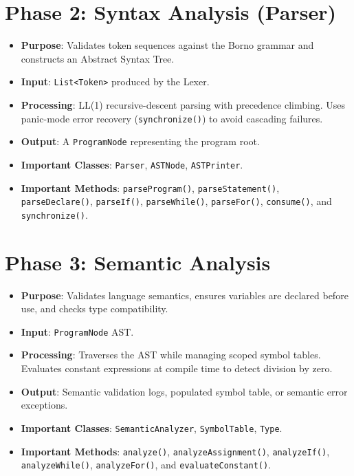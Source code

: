\documentclass[12pt, a4paper]{report}
\begin{document}
\section{Phase 2: Syntax Analysis (Parser)}
\begin{itemize}
    \item \textbf{Purpose}: Validates token sequences against the Borno grammar and constructs an Abstract Syntax Tree.
    \item \textbf{Input}: \texttt{List<Token>} produced by the Lexer.
    \item \textbf{Processing}: LL(1) recursive-descent parsing with precedence climbing. Uses panic-mode error recovery (\texttt{synchronize()}) to avoid cascading failures.
    \item \textbf{Output}: A \texttt{ProgramNode} representing the program root.
    \item \textbf{Important Classes}: \texttt{Parser}, \texttt{ASTNode}, \texttt{ASTPrinter}.
    \item \textbf{Important Methods}: \texttt{parseProgram()}, \texttt{parseStatement()}, \texttt{parseDeclare()}, \texttt{parseIf()}, \texttt{parseWhile()}, \texttt{parseFor()}, \texttt{consume()}, and \texttt{synchronize()}.
\end{itemize}

\section{Phase 3: Semantic Analysis}
\begin{itemize}
    \item \textbf{Purpose}: Validates language semantics, ensures variables are declared before use, and checks type compatibility.
    \item \textbf{Input}: \texttt{ProgramNode} AST.
    \item \textbf{Processing}: Traverses the AST while managing scoped symbol tables. Evaluates constant expressions at compile time to detect division by zero.
    \item \textbf{Output}: Semantic validation logs, populated symbol table, or semantic error exceptions.
    \item \textbf{Important Classes}: \texttt{SemanticAnalyzer}, \texttt{SymbolTable}, \texttt{Type}.
    \item \textbf{Important Methods}: \texttt{analyze()}, \texttt{analyzeAssignment()}, \texttt{analyzeIf()}, \texttt{analyzeWhile()}, \texttt{analyzeFor()}, and \texttt{evaluateConstant()}.
\end{itemize}
\end{document}
